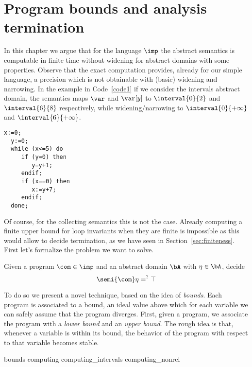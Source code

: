 \chapter{Program bounds and analysis termination}\label{chap:axiomatized}


In this chapter we argue that for the language \(\imp\) the abstract
semantics is computable in finite time without widening for abstract
domains with some properties.  Observe that the exact computation
provides, already for our simple language, a precision which is not
obtainable with (basic) widening and narrowing. In the example in
Code~\ref{code1} if we consider the intervals abstract domain, the
semantics maps \(\var\) and \(\var[y]\) to \(\interval{0}{2}\) and
\(\interval{6}{8}\) respectively, while widening/narrowing to
\(\interval{0}{+\infty}\) and \(\interval{6}{+\infty}\).

\begin{lstlisting}[caption=Code sample where analysis of
  \(\fix{\com}\) is less precise than \(\com^*\), label=code1,
  language=Imp]
  x:=0;
  y:=0;
  while (x<=5) do
     if (y=0) then
        y=y+1;
     endif;
     if (x==0) then
        x:=y+7;
     endif;
  done;
\end{lstlisting}

Of course, for the collecting semantics this is not the case. Already
computing a finite upper bound for loop invariants when they are
finite is impossible as this would allow to decide termination, as we
have seen in Section~\ref{sec:finiteness}. First let's formalize the
problem we want to solve.

\begin{problem}\label{problem1}
  Given a program \(\com\in \imp\) and an abstract domain \(\bA\) with
  \(\eta \in \bA\), decide
  \begin{equation*}
    \semi{\com} \eta =^? \top
  \end{equation*}
\end{problem}

To do so we present a novel technique, based on the idea of
\emph{bounds}. Each program is associated to a bound, an ideal value
above which for each variable we can safely assume that the program
diverges.  First, given a program, we associate the program with a
\emph{lower bound} and an \emph{upper bound}. The rough idea is that,
whenever a variable is within its bound, the behavior of the program
with respect to that variable becomes stable. %

{bounds}
{computing}
{computing_intervals}
{computing_nonrel}
